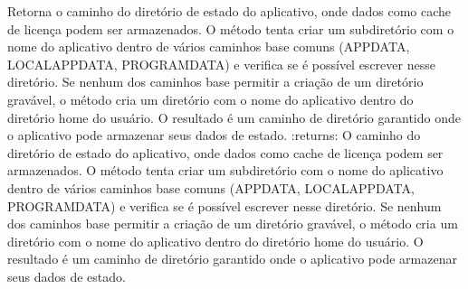 \documentclass[letterpaper,10pt,english]{sphinxmanual}
\begin{document}
\begin{fulllineitems}
\label{\detokenize{api/online_license:online_license.app_state_dir}}
\pysigstartsignatures
\pysiglinewithargsret
{}
{}
{}
\pysigstopsignatures
\sphinxAtStartPar
Retorna o caminho do diretório de estado do aplicativo, onde dados como cache de licença podem ser armazenados. O método tenta criar um subdiretório com o nome do aplicativo dentro de vários caminhos base comuns (APPDATA, LOCALAPPDATA, PROGRAMDATA) e verifica se é possível escrever nesse diretório. Se nenhum dos caminhos base permitir a criação de um diretório gravável, o método cria um diretório com o nome do aplicativo dentro do diretório home do usuário. O resultado é um caminho de diretório garantido onde o aplicativo pode armazenar seus dados de estado.
:returns: O caminho do diretório de estado do aplicativo, onde dados como cache de licença podem ser armazenados. O método tenta criar um subdiretório com o nome do aplicativo dentro de vários caminhos base comuns (APPDATA, LOCALAPPDATA, PROGRAMDATA) e verifica se é possível escrever nesse diretório. Se nenhum dos caminhos base permitir a criação de um diretório gravável, o método cria um diretório com o nome do aplicativo dentro do diretório home do usuário. O resultado é um caminho de diretório garantido onde o aplicativo pode armazenar seus dados de estado.
\begin{quote}\begin{description}
\sphinxAtStartPar
{}

\end{description}\end{quote}

\end{fulllineitems}

\end{document}
